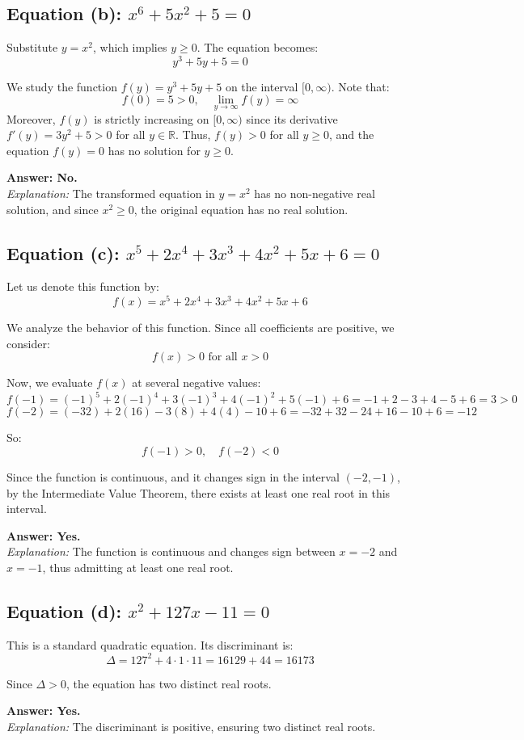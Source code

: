 \documentclass[12pt]{article}
\begin{document}
\subsection{Equation (b): \( x^6 + 5x^2 + 5 = 0 \)}

Substitute \( y = x^2 \), which implies \( y \geq 0 \). The equation becomes:
\[
y^3 + 5y + 5 = 0
\]

We study the function \( f(y) = y^3 + 5y + 5 \) on the interval \( [0, \infty) \). Note that:
\[
f(0) = 5 > 0, \quad \lim_{y \to \infty} f(y) = \infty
\]
Moreover, \( f(y) \) is strictly increasing on \( [0, \infty) \) since its derivative \( f'(y) = 3y^2 + 5 > 0 \) for all \( y \in \mathbb{R} \). Thus, \( f(y) > 0 \) for all \( y \geq 0 \), and the equation \( f(y) = 0 \) has no solution for \( y \geq 0 \).

\textbf{Answer: No.} \\
\textit{Explanation:} The transformed equation in \( y = x^2 \) has no non-negative real solution, and since \( x^2 \geq 0 \), the original equation has no real solution.

\subsection{Equation (c): \( x^5 + 2x^4 + 3x^3 + 4x^2 + 5x + 6 = 0 \)}

Let us denote this function by:
\[
f(x) = x^5 + 2x^4 + 3x^3 + 4x^2 + 5x + 6
\]

We analyze the behavior of this function. Since all coefficients are positive, we consider:
\[
f(x) > 0 \text{ for all } x > 0
\]

Now, we evaluate \( f(x) \) at several negative values:
\[
f(-1) = (-1)^5 + 2(-1)^4 + 3(-1)^3 + 4(-1)^2 + 5(-1) + 6 = -1 + 2 - 3 + 4 - 5 + 6 = 3 > 0
\]
\[
f(-2) = (-32) + 2(16) - 3(8) + 4(4) -10 + 6 = -32 + 32 - 24 + 16 -10 + 6 = -12
\]

So:
\[
f(-1) > 0, \quad f(-2) < 0
\]

Since the function is continuous, and it changes sign in the interval \((-2, -1)\), by the Intermediate Value Theorem, there exists at least one real root in this interval.

\textbf{Answer: Yes.} \\
\textit{Explanation:} The function is continuous and changes sign between \( x = -2 \) and \( x = -1 \), thus admitting at least one real root.

\subsection{Equation (d): \( x^2 + 127x - 11 = 0 \)}

This is a standard quadratic equation. Its discriminant is:
\[
\Delta = 127^2 + 4 \cdot 1 \cdot 11 = 16129 + 44 = 16173
\]

Since \( \Delta > 0 \), the equation has two distinct real roots.

\textbf{Answer: Yes.} \\
\textit{Explanation:} The discriminant is positive, ensuring two distinct real roots.
\end{document}
